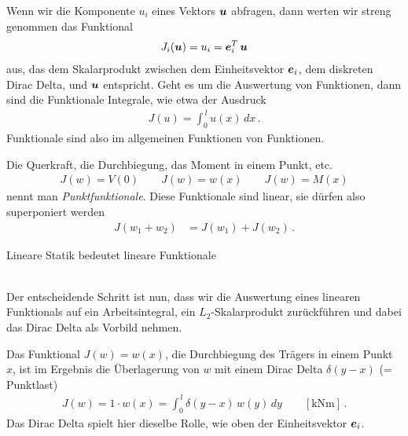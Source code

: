 Wenn wir die Komponente $u_i$ eines Vektors $\mbox{\boldmath $u$}$ abfragen, dann werten wir streng genommen das Funktional
\begin{align}
J_i(\mbox{\boldmath $u$}) = u_i = \mbox{\boldmath $e$}_i^T\,\mbox{\boldmath $u$}
\end{align}
aus, das dem Skalarprodukt zwischen dem Einheitsvektor $\mbox{\boldmath $e$}_i$, dem diskreten Dirac Delta, und $\mbox{\boldmath $u$}$ entspricht. Geht es um die Auswertung von Funktionen, dann sind die Funktionale Integrale, wie etwa der Ausdruck
\begin{align} \label{Eq43}
J(u) = \int_0^{\,l} u(x)\,dx\,.
\end{align}
Funktionale sind also im allgemeinen Funktionen von Funktionen.

Die Querkraft, die Durchbiegung, das Moment in einem Punkt, etc.
\begin{align}\label{Eq20}
J(w) = V(0) \qquad J(w) = w(x) \qquad J(w) = M(x)
\end{align}
nennt man {\em Punktfunktionale\/}. Diese Funktionale sind linear, sie d\"{u}rfen also superponiert werden
\begin{align}
J(w_1 + w_2) &=  J(w_1) + J(w_2)\,.
\end{align}

\hspace*{-12pt}\colorbox{highlightBlue}{\parbox{0.98\textwidth}{Lineare Statik bedeutet lineare Funktionale}}\\

Der entscheidende Schritt ist nun, dass wir die Auswertung eines linearen Funktionals auf ein Arbeitsintegral, ein $L_2$-Skalarprodukt zur\"{u}ckf\"{u}hren und dabei das Dirac Delta als Vorbild nehmen.

Das Funktional $J(w) = w(x)$, die Durchbiegung des Tr\"{a}gers in einem Punkt $x$, ist im Ergebnis die \"{U}berlagerung von $w$ mit einem Dirac Delta $\delta(y-x)$ (= Punktlast)
\begin{align}\label{Eq125}
J(w) = 1 \cdot w(x) = \int_0^{\,l} \delta(y-x)\,w(y)\,dy \qquad [\text{kNm}]\,.
\end{align}
Das Dirac Delta spielt hier dieselbe Rolle, wie oben der Einheitsvektor $\mbox{\boldmath $e$}_i$.

